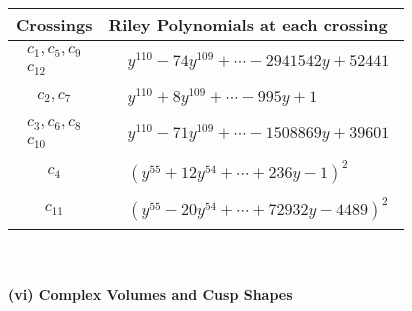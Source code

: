 \documentclass[1p]{elsarticle_modified}
\theoremstyle{definition}
\begin{document}
\begin{tabular}{m{50pt}|m{274pt}}
Crossings & \hspace{64pt}Riley Polynomials at each crossing \\
\hline $$\begin{aligned}c_{1},c_{5},c_{9}\\c_{12}\end{aligned}$$&$\begin{aligned}
&y^{110}-74 y^{109}+\cdots-2941542 y+52441
\end{aligned}$\\
\hline $$\begin{aligned}c_{2},c_{7}\end{aligned}$$&$\begin{aligned}
&y^{110}+8 y^{109}+\cdots-995 y+1
\end{aligned}$\\
\hline $$\begin{aligned}c_{3},c_{6},c_{8}\\c_{10}\end{aligned}$$&$\begin{aligned}
&y^{110}-71 y^{109}+\cdots-1508869 y+39601
\end{aligned}$\\
\hline $$\begin{aligned}c_{4}\end{aligned}$$&$\begin{aligned}
&(y^{55}+12 y^{54}+\cdots+236 y-1)^{2}
\end{aligned}$\\
\hline $$\begin{aligned}c_{11}\end{aligned}$$&$\begin{aligned}
&(y^{55}-20 y^{54}+\cdots+72932 y-4489)^{2}
\end{aligned}$\\
\hline
\end{tabular}\\~\\
\newpage\flushleft \textbf{(vi) Complex Volumes and Cusp Shapes}
\end{document}
